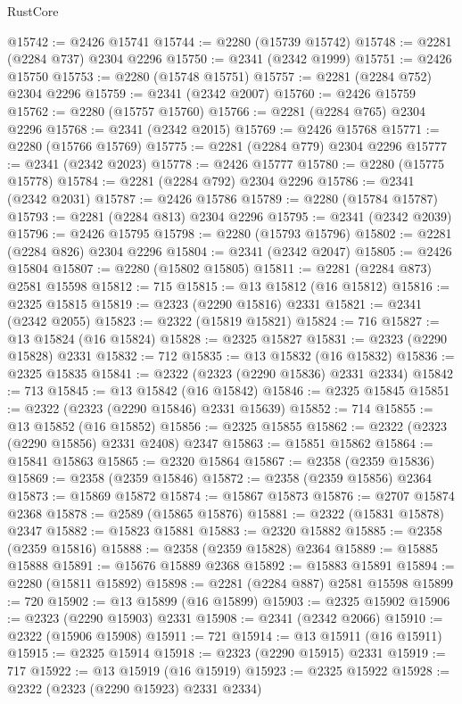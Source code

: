\begin{lexlean}{RustCore}
\begin{coremodule}
@15742 := @2426 @15741
@15744 := @2280 (@15739 @15742)
@15748 := @2281 (@2284 @737) @2304 @2296
@15750 := @2341 (@2342 @1999)
@15751 := @2426 @15750
@15753 := @2280 (@15748 @15751)
@15757 := @2281 (@2284 @752) @2304 @2296
@15759 := @2341 (@2342 @2007)
@15760 := @2426 @15759
@15762 := @2280 (@15757 @15760)
@15766 := @2281 (@2284 @765) @2304 @2296
@15768 := @2341 (@2342 @2015)
@15769 := @2426 @15768
@15771 := @2280 (@15766 @15769)
@15775 := @2281 (@2284 @779) @2304 @2296
@15777 := @2341 (@2342 @2023)
@15778 := @2426 @15777
@15780 := @2280 (@15775 @15778)
@15784 := @2281 (@2284 @792) @2304 @2296
@15786 := @2341 (@2342 @2031)
@15787 := @2426 @15786
@15789 := @2280 (@15784 @15787)
@15793 := @2281 (@2284 @813) @2304 @2296
@15795 := @2341 (@2342 @2039)
@15796 := @2426 @15795
@15798 := @2280 (@15793 @15796)
@15802 := @2281 (@2284 @826) @2304 @2296
@15804 := @2341 (@2342 @2047)
@15805 := @2426 @15804
@15807 := @2280 (@15802 @15805)
@15811 := @2281 (@2284 @873) @2581 @15598
@15812 := 715
@15815 := @13 @15812 (@16 @15812)
@15816 := @2325 @15815
@15819 := @2323 (@2290 @15816) @2331
@15821 := @2341 (@2342 @2055)
@15823 := @2322 (@15819 @15821)
@15824 := 716
@15827 := @13 @15824 (@16 @15824)
@15828 := @2325 @15827
@15831 := @2323 (@2290 @15828) @2331
@15832 := 712
@15835 := @13 @15832 (@16 @15832)
@15836 := @2325 @15835
@15841 := @2322 (@2323 (@2290 @15836) @2331 @2334)
@15842 := 713
@15845 := @13 @15842 (@16 @15842)
@15846 := @2325 @15845
@15851 := @2322 (@2323 (@2290 @15846) @2331 @15639)
@15852 := 714
@15855 := @13 @15852 (@16 @15852)
@15856 := @2325 @15855
@15862 := @2322 (@2323 (@2290 @15856) @2331 @2408) @2347
@15863 := @15851 @15862
@15864 := @15841 @15863
@15865 := @2320 @15864
@15867 := @2358 (@2359 @15836)
@15869 := @2358 (@2359 @15846)
@15872 := @2358 (@2359 @15856) @2364
@15873 := @15869 @15872
@15874 := @15867 @15873
@15876 := @2707 @15874 @2368
@15878 := @2589 (@15865 @15876)
@15881 := @2322 (@15831 @15878) @2347
@15882 := @15823 @15881
@15883 := @2320 @15882
@15885 := @2358 (@2359 @15816)
@15888 := @2358 (@2359 @15828) @2364
@15889 := @15885 @15888
@15891 := @15676 @15889 @2368
@15892 := @15883 @15891
@15894 := @2280 (@15811 @15892)
@15898 := @2281 (@2284 @887) @2581 @15598
@15899 := 720
@15902 := @13 @15899 (@16 @15899)
@15903 := @2325 @15902
@15906 := @2323 (@2290 @15903) @2331
@15908 := @2341 (@2342 @2066)
@15910 := @2322 (@15906 @15908)
@15911 := 721
@15914 := @13 @15911 (@16 @15911)
@15915 := @2325 @15914
@15918 := @2323 (@2290 @15915) @2331
@15919 := 717
@15922 := @13 @15919 (@16 @15919)
@15923 := @2325 @15922
@15928 := @2322 (@2323 (@2290 @15923) @2331 @2334)

\end{coremodule}
\end{lexlean}
